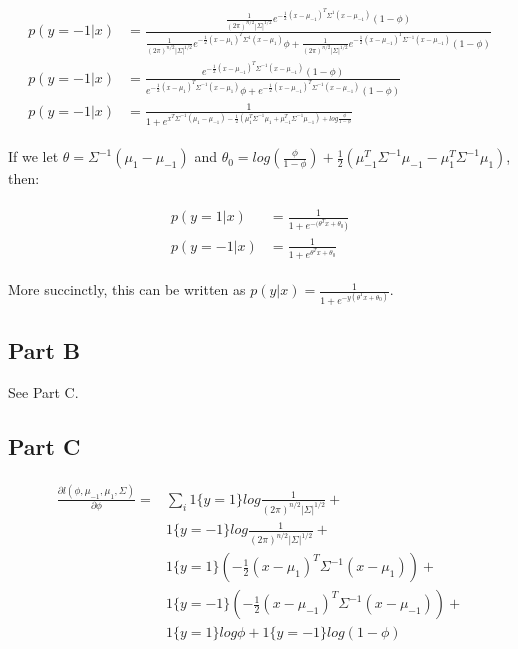 \documentclass[11pt]{article}
\begin{document}
\begin{align}
	\begin{split}
		p(y=-1|x) &= \frac{\frac{1}{(2\pi)^{n/2}|\Sigma|^{1/2}}e^{-\frac{1}{2}(x-\mu_{-1})^T\Sigma^{1}(x-\mu_{-1})}(1-\phi)}
                     {\frac{1}{(2\pi)^{n/2}|\Sigma|^{1/2}}e^{-\frac{1}{2}(x-\mu_{1})^T\Sigma^{1}(x-\mu_{1})}\phi +
											\frac{1}{(2\pi)^{n/2}|\Sigma|^{1/2}}e^{-\frac{1}{2}(x-\mu_{-1})^T\Sigma^{-1}(x-\mu_{-1})}(1-\phi)} \\
		p(y=-1|x) &= \frac{e^{-\frac{1}{2}(x-\mu_{-1})^T\Sigma^{-1}(x-\mu_{-1})}(1-\phi)}
                     {e^{-\frac{1}{2}(x-\mu_{1})^T\Sigma^{-1}(x-\mu_{1})}\phi +
											e^{-\frac{1}{2}(x-\mu_{-1})^T\Sigma^{-1}(x-\mu_{-1})}(1-\phi)} \\
		p(y=-1|x) &= \frac{1}{1 + e^{ x^T\Sigma^{-1}(\mu_{1}-\mu_{-1}) - 
								\frac{1}{2}(\mu_{1}^T\Sigma^{-1}\mu_{1} + \mu_{-1}^T\Sigma^{-1}\mu_{-1}) + 
								log\frac{\phi}{1-\phi}}}
	\end{split}
\end{align}

If we let $\theta=\Sigma^{-1}(\mu_1-\mu_{-1})$ and 
$\theta_0=log(\frac{\phi}{1-\phi})+\frac{1}{2}(\mu^T_{-1}\Sigma^{-1}\mu_{-1}-
\mu_1^T\Sigma^{-1}\mu_1)$, then:

\begin{align}
	\begin{split}
		p(y=1|x) &= \frac{1}{1+e^{-(\theta^Tx + \theta_0})} \\
		p(y=-1|x) &= \frac{1}{1+e^{\theta^Tx + \theta_0}}
	\end{split}
\end{align}

More succinctly, this can be written as $p(y|x)=\frac{1}{1+e^{-y(\theta^Tx + \theta_0)}}$.

\subsection*{Part B}
See Part C.
\subsection*{Part C}

\begin{align}
	\begin{split}
		\frac{\partial l(\phi, \mu_{-1}, \mu_{1}, \Sigma)}{\partial \phi} =& \sum_{i} 
				1\{y=1\}log\frac{1}{(2\pi)^{n/2}|\Sigma|^{1/2}} + \\ 
				&1\{y=-1\}log\frac{1}{(2\pi)^{n/2}|\Sigma|^{1/2}} + \\ 
				&1\{y=1\}(-\frac{1}{2}(x-\mu_1)^T\Sigma^{-1}(x-\mu_1)) + \\ 
				&1\{y=-1\}(-\frac{1}{2}(x-\mu_{-1})^T\Sigma^{-1}(x-\mu_{-1})) + \\ 
				&1\{y=1\}log\phi + 1\{y=-1\}log(1-\phi)
  \end{split}
\end{align}
\end{document}

